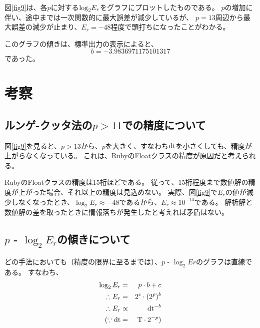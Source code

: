 \documentclass[11pt]{jsarticle}
\newcommand{\fr}[1]{図\ref{#1}}
\newcommand{\dtn}{{\rm dt}}
\begin{document}
            \fr{fig9}は、各$p$に対する${\rm log}_2E_r$をグラフにプロットしたものである。
            $p$の増加に伴い、途中までは一次関数的に最大誤差が減少しているが、
            $p = 13$周辺から最大誤差の減少が止まり、$E_r = -48$程度で頭打ちになったことがわかる。

            このグラフの傾きは、標準出力の表示によると、
            \[
                b = -3.9836971175101317
            \]
            であった。

    \section{考察}

        \subsection{ルンゲ-クッタ法の$p > 11$での精度について}
            \fr{fig9}を見ると、$p > 13$から、$p$を大きく、すなわち$\dtn$を小さくしても、精度が上がらなくなっている。
            これは、RubyのFloatクラスの精度が原因だと考えられる。

            RubyのFloatクラスの精度は15桁ほどである。
            従って、15桁程度まで数値解の精度が上がった場合、それ以上の精度は見込めない。 
            実際、\fr{fig9}で$E_r$の値が減少しなくなったとき、$\log_2 E_r \approx -48$であるから、$E_r \approx 10^{-14}$である。
            解析解と数値解の差を取ったときに情報落ちが発生したと考えれば矛盾はない。

        \subsection{$p$ - $\log_2 E_r$の傾きについて}
            どの手法においても（精度の限界に至るまでは）、$p$ - $\log_2 Er$のグラフは直線である。
            すなわち、
            \begin{eqnarray*}
                \log_2 E_r & = & p \cdot b + c \\
                \therefore E_r & = & 2^c \cdot (2^p)^b \\
                \therefore E_r & \propto & \dtn^{-b} \\
                (\because \dtn & = & {\rm T} \cdot 2^{-p} )
            \end{eqnarray*}
\end{document}
